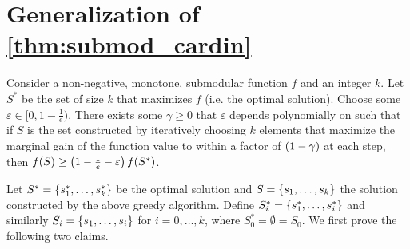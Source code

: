 \section{Generalization of \cref{thm:submod_cardin}}
\label{sec:submod_cardin_modify}

\begin{theorem}
    Consider a non-negative, monotone, submodular function $f$ and an integer $k$. Let $S^*$ be the set of size $k$ that maximizes $f$ (i.e.\! the optimal solution). 
    Choose some $\varepsilon \in [0, 1 - \frac{1}{e})$.
    There exists some $\gamma \geq 0$ that $\varepsilon$ depends polynomially on such that if $S$ is the set constructed by iteratively choosing $k$ elements that maximize the marginal gain of the function value 
    to within a factor of $\left( 1-\gamma \right)$ at each step, 
    then $f \! \left( S \right) \geq \left( 1 - \frac{1}{e} - \varepsilon \right)f \! \left( S^* \right)$. 
    \label{thm:submod_cardin_gen}
\end{theorem}

Let $S^{\ast} = \left\{ s_1^{\ast}, \ldots, s_k^{\ast} \right\}$ be the optimal solution and $S = \left\{ s_1, \ldots, s_k \right\}$ the solution constructed by the above greedy algorithm.
Define $S_i^{\ast} = \left\{ s_1^{\ast}, \ldots, s_i^{\ast} \right\}$ and similarly $S_i = \left\{ s_1, \ldots, s_i \right\}$ for $i = 0, \ldots, k$, where $S_0^{\ast} = \emptyset = S_0$. 
We first prove the following two claims. 

